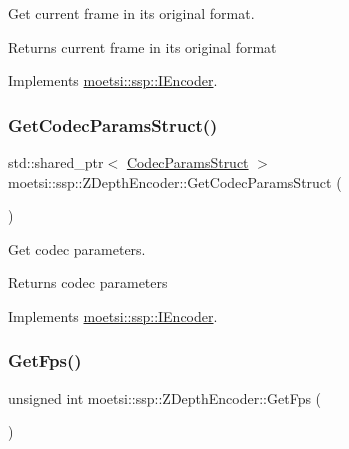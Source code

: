 Get current frame in its original format. 

\begin{DoxyReturn}{Returns}
current frame in its original format 
\end{DoxyReturn}


Implements \hyperlink{classmoetsi_1_1ssp_1_1IEncoder_ab60bdaae0a85289dfa31a12bab533dc0}{moetsi\+::ssp\+::\+I\+Encoder}.

\mbox{\label{classmoetsi_1_1ssp_1_1ZDepthEncoder_a3fc9f84387dba09d1deb4761031b598f}} 
\subsubsection{\texorpdfstring{Get\+Codec\+Params\+Struct()}{GetCodecParamsStruct()}}
{\footnotesize\ttfamily std\+::shared\+\_\+ptr$<$ \hyperlink{structmoetsi_1_1ssp_1_1CodecParamsStruct}{Codec\+Params\+Struct} $>$ moetsi\+::ssp\+::\+Z\+Depth\+Encoder\+::\+Get\+Codec\+Params\+Struct (\begin{DoxyParamCaption}{ }\end{DoxyParamCaption})\hspace{0.3cm}{\ttfamily [virtual]}}



Get codec parameters. 

\begin{DoxyReturn}{Returns}
codec parameters 
\end{DoxyReturn}


Implements \hyperlink{classmoetsi_1_1ssp_1_1IEncoder_ad5179efaa4c74207766dd64f46f4059a}{moetsi\+::ssp\+::\+I\+Encoder}.

\mbox{\label{classmoetsi_1_1ssp_1_1ZDepthEncoder_a9ea0a5783d7d265fccc3a2c262600552}} 
\subsubsection{\texorpdfstring{Get\+Fps()}{GetFps()}}
{\footnotesize\ttfamily unsigned int moetsi\+::ssp\+::\+Z\+Depth\+Encoder\+::\+Get\+Fps (\begin{DoxyParamCaption}{ }\end{DoxyParamCaption})\hspace{0.3cm}{\ttfamily [virtual]}}




